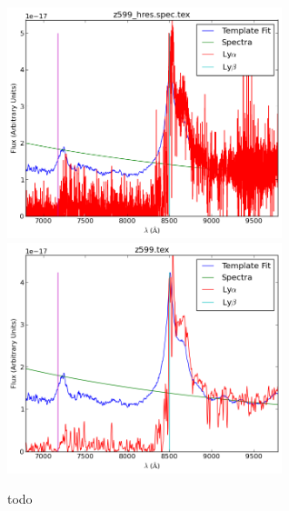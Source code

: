 \documentclass[11pt]{article}
\begin{document}
\begin{figure}[h]
  \includegraphics[width=8cm]{z599_hres_spec.png}
  \includegraphics[width=8cm]{z599.png}
  \caption{todo}
  \label{fig:todo}
\end{figure}
\end{document}
